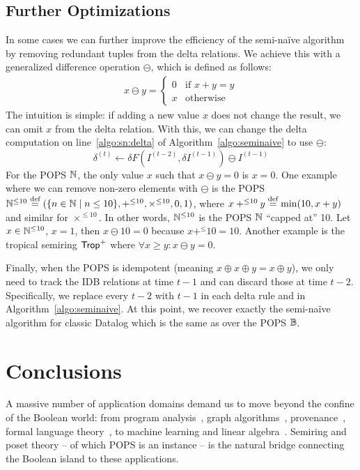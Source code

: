 \subsection{Further Optimizations}
\label{sec:redundant}
In some cases we can further improve the efficiency of the semi-na\"ive algorithm
 by removing redundant tuples from the delta relations.
We achieve this with a generalized difference operation $\ominus$,
 which is defined as follows:
%
\begin{align*}
  x \ominus y = \begin{cases}
    0 & \text{if } x + y = y \\
    x & \text{otherwise}
  \end{cases}
\end{align*}
%
The intuition is simple: if adding a new value $x$ does not change the result, 
 we can omit $x$ from the delta relation.
With this, we can change the delta computation
 on line~\ref{algo:sn:delta}
 of Algorithm~\ref{algo:seminaive} 
 to use $\ominus$:
%
$$\delta^{(t)} \gets \delta F(I^{(t-2)}, \delta I^{(t-1)}) \ominus I^{(t-1)}$$
%
For the POPS $\mathbb N$, the only value $x$ such that $x \ominus y = 0$ is $x = 0$. 
One example where we can remove non-zero elements with $\ominus$ 
 is the POPS ${\mathbb N}^{\leq 10} \stackrel{\text{def}}{=} (\{{n \in \mathbb N}\mid{n \leq 10}\}, +^{\leq 10}, \times^{\leq 10}, 0, 1)$, 
 where $x +^{\leq 10}y \stackrel{\text{def}}{=} \min(10, x + y)$ and similar for $\times^{\leq 10}$.
In other words, $\mathbb N^{\leq 10}$ is the POPS $\mathbb N$ ``capped at'' 10.
Let $x \in \mathbb N^{\leq 10}$, $x = 1$, then $x \ominus 10 = 0$ because $x +^{\leq} 10 = 10$.
Another example is the tropical semiring $\text{\sf Trop}^+$
 where $\forall x \geq y : x \ominus y = 0$.

Finally, when the POPS is idempotent (meaning $x \oplus x \oplus y = x \oplus y$),
 we only need to track the IDB relations at time $t-1$
 and can discard those at time $t-2$.
Specifically, we replace every $t-2$ with $t-1$
 in each delta rule and in Algorithm~\ref{algo:seminaive}.
At this point, we recover exactly the semi-na\"ive algorithm for classic Datalog
 which is the same as \datalogo over the POPS $\mathbb B$.

\section{Conclusions}
\label{sec:datalogo:conclusions}

A massive number of application domains demand us to move beyond the confine of the Boolean
world: from program analysis~\cite{DBLP:conf/popl/CousotC77,MR1728440},
graph algorithms~\cite{MR556411,MR584516,MR526496},
provenance~\cite{DBLP:conf/pods/GreenKT07},
formal language theory~\cite{MR1470001}, to machine learning and linear
algebra~\cite{einsum:rocktaschel,DBLP:conf/osdi/AbadiBCCDDDGIIK16}.
Semiring and poset theory -- of which POPS is an instance -- is the natural
bridge connecting the Boolean island to these applications.

